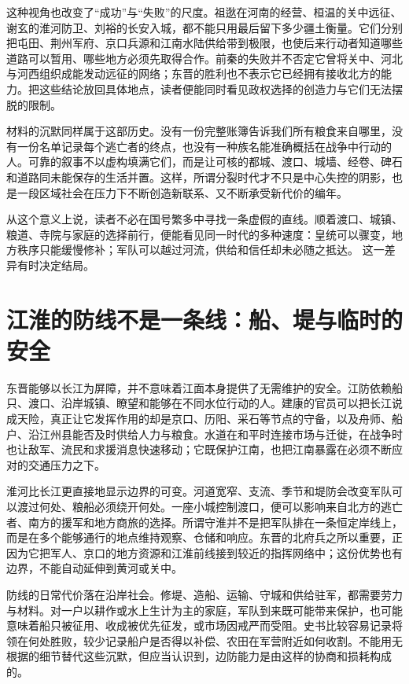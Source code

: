 这种视角也改变了“成功”与“失败”的尺度。祖逖在河南的经营、桓温的关中远征、谢玄的淮河防卫、刘裕的长安入城，都不能只用最后留下多少疆土衡量。它们分别把屯田、荆州军府、京口兵源和江南水陆供给带到极限，也使后来行动者知道哪些道路可以暂用、哪些地方必须先取得合作。前秦的失败并不否定它曾将关中、河北与河西组织成能发动远征的网络；东晋的胜利也不表示它已经拥有接收北方的能力。把这些结论放回具体地点，读者便能同时看见政权选择的创造力与它们无法摆脱的限制。

材料的沉默同样属于这部历史。没有一份完整账簿告诉我们所有粮食来自哪里，没有一份名单记录每个逃亡者的终点，也没有一种族名能准确概括在战争中行动的人。可靠的叙事不以虚构填满它们，而是让可核的都城、渡口、城墙、经卷、碑石和道路同未能保存的生活并置。这样，所谓分裂时代才不只是中心失控的阴影，也是一段区域社会在压力下不断创造新联系、又不断承受新代价的编年。

从这个意义上说，读者不必在国号繁多中寻找一条虚假的直线。顺着渡口、城镇、粮道、寺院与家庭的选择前行，便能看见同一时代的多种速度：皇统可以骤变，地方秩序只能缓慢修补；军队可以越过河流，供给和信任却未必随之抵达。
这一差异有时决定结局。

\section{江淮的防线不是一条线：船、堤与临时的安全}
\label{sec:eastern-jin-depth-river-defence}

东晋能够以长江为屏障，并不意味着江面本身提供了无需维护的安全。江防依赖船只、渡口、沿岸城镇、瞭望和能够在不同水位行动的人。建康的官员可以把长江说成天险，真正让它发挥作用的却是京口、历阳、采石等节点的守备，以及舟师、船户、沿江州县能否及时供给人力与粮食。水道在和平时连接市场与迁徙，在战争时也让敌军、流民和求援消息快速移动；它既保护江南，也把江南暴露在必须不断应对的交通压力之下。

淮河比长江更直接地显示边界的可变。河道宽窄、支流、季节和堤防会改变军队可以渡过何处、粮船必须绕开何处。一座小城控制渡口，便可以影响来自北方的逃亡者、南方的援军和地方商旅的选择。所谓守淮并不是把军队排在一条恒定岸线上，而是在多个能够通行的地点维持观察、仓储和响应。东晋的北府兵之所以重要，正因为它把军人、京口的地方资源和江淮前线接到较近的指挥网络中；这份优势也有边界，不能自动延伸到黄河或关中。

防线的日常代价落在沿岸社会。修堤、造船、运输、守城和供给驻军，都需要劳力与材料。对一户以耕作或水上生计为主的家庭，军队到来既可能带来保护，也可能意味着船只被征用、收成被优先征发，或市场因戒严而受阻。史书比较容易记录将领在何处胜败，较少记录船户是否得以补偿、农田在军营附近如何收割。不能用无根据的细节替代这些沉默，但应当认识到，边防能力是由这样的协商和损耗构成的。

